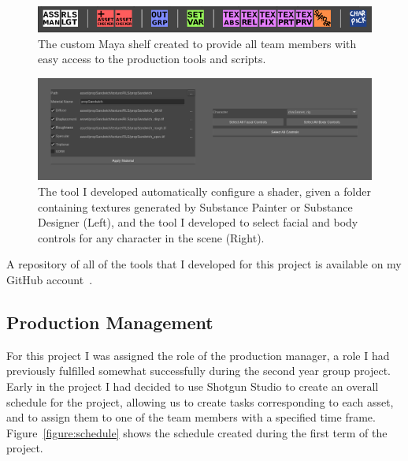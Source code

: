 \documentclass[11pt]{article}
\begin{document}
\begin{figure}[htbp]
\centering
\includegraphics[width=1.0\linewidth]{images/shelf.png}
\caption{\label{figure:shelf} The custom Maya shelf created to provide all team members with easy access to the production tools and scripts.}
\end{figure}

\begin{figure}[htbp]
\centering
\includegraphics[width=1.0\linewidth]{images/miscScripts.png}
\caption{\label{figure:miscScripts} The tool I developed automatically configure a shader, given a folder containing textures generated by Substance Painter or Substance Designer (Left), and the tool I developed to select facial and body controls for any character in the scene (Right).}
\end{figure}

A repository of all of the tools that I developed for this project is available on my GitHub account~\cite{myGitHub}.

\subsection{Production Management} \label{productionManagement}

For this project I was assigned the role of the production manager, a role I had previously fulfilled somewhat successfully during the second year group project. Early in the project I had decided to use Shotgun Studio to create an overall schedule for the project, allowing us to create tasks corresponding to each asset, and to assign them to one of the team members with a specified time frame. Figure~\ref{figure:schedule} shows the schedule created during the first term of the project.
\end{document}
